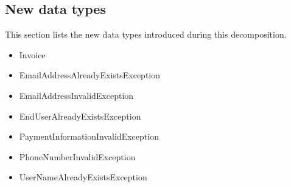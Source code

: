 \subsection*{New data types}
    This section lists the new data types introduced during this decomposition.

    \begin{itemize}
        \item Invoice
        \item EmailAddressAlreadyExistsException
        \item EmailAddressInvalidException
        \item EndUserAlreadyExistsException
        \item PaymentInformationInvalidException
        \item PhoneNumberInvalidException
        \item UserNameAlreadyExistsException
    \end{itemize}
